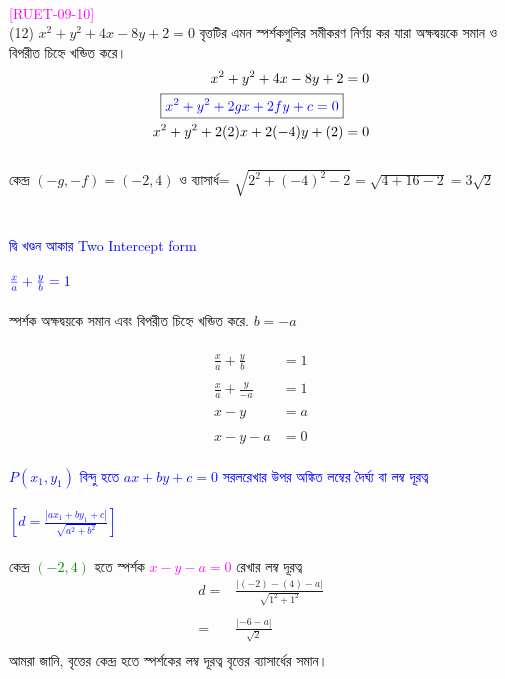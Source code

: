 \documentclass{article}
\begin{document}
	\\
	\textcolor{magenta}{[RUET-09-10]}\\
(12)	$x^2+y^2+4x-8y+2=0$ বৃত্তটির এমন স্পর্শকগুলির সমীকরণ নির্ণয় কর যারা অক্ষদ্বয়কে সমান ও বিপরীত চিহ্নে খন্ডিত করে। \\
	\begin{align*}
		x^2+y^2+4x-8y+2&=0\\
		\boxed{\textcolor{blue}{x^2+y^2+2gx+2fy+c=0}}&\\
		x^2+y^2+2(2)x+2(-4)y+(2)&=0
	\end{align*}
	\\
	কেন্দ্র 	$(-g,-f)=(-2,4)$ ও ব্যাসার্ধ= $\sqrt{2^2+(-4)^2-2}=\sqrt{4+16-2}=3\sqrt{2}$\\
	\\  
	\\
	\textcolor{blue}{ দ্বি খণ্ডন আকার  Two	Intercept form}\\
	\\
	$\textcolor{blue}{\frac{x}{a}+\frac{y}{b}=1}$\\
	\\
	স্পর্শক অক্ষদ্বয়কে সমান এবং বিপরীত চিহ্নে খন্ডিত করে. $b=-a$\\
	\\
	\begin{align*}
		\frac{x}{a}+\frac{y}{b}&=1\\
		\\
		\frac{x}{a}+\frac{y}{-a}&=1\\
		\\
		x-y&=a\\
		\\
		x-y-a&=0
	\end{align*}
	\\  
	\textcolor{blue}{$P(x_1,y_1)$ বিন্দু হতে  $ax+by+c=0$ সরলরেখার উপর অঙ্কিত লম্বের দৈর্ঘ্য বা লম্ব দূরত্ব \\
		\\
		$\left[d=\frac{|ax_1+by_1+c|}{\sqrt{a^2+b^2}}\right]$}\\
	\\
	কেন্দ্র \textcolor{green}{$(-2,4)$} হতে স্পর্শক \textcolor{magenta}{$x-y-a=0$}  রেখার লম্ব দূরত্ব \\
	\begin{align*}
		d=	&\frac{|(-2)-(4)-a|}{\sqrt{1^2+1^2}}\\
		\\
		=	&	\frac{|-6-a|}{\sqrt{2}}\\
	\end{align*}
	আমরা জানি, বৃত্তের কেন্দ্র হতে স্পর্শকের লম্ব দূরত্ব বৃত্তের ব্যাসার্ধের সমান। \\
\end{document}

